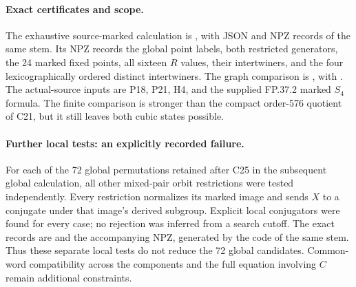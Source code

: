\paragraph{Exact certificates and scope.}
The exhaustive source-marked calculation is
,
with JSON and NPZ records of the same stem.  Its NPZ records the
global point labels, both restricted generators, the 24 marked
fixed points, all sixteen $R$ values, their intertwiners, and
the four lexicographically ordered distinct intertwiners.
The graph comparison is
, with
.
The actual-source inputs are P18, P21, H4, and the supplied
FP.37.2 marked $S_4$ formula.  The finite comparison is stronger
than the compact order-576 quotient of C21, but it still leaves
both cubic states possible.

\paragraph{Further local tests: an explicitly recorded failure.}
For each of the 72 global permutations retained after C25 in
the subsequent global calculation, all other mixed-pair orbit
restrictions were tested independently.  Every restriction
normalizes its marked image and sends $X$ to a conjugate under
that image's derived subgroup.  Explicit local conjugators
were found for every case; no rejection was inferred from a
search cutoff.  The exact records are
and the accompanying NPZ, generated by the code of the same
stem.  Thus these separate local tests do not reduce the 72
global candidates.  Common-word compatibility across the
components and the full equation involving $C$ remain
additional constraints.

